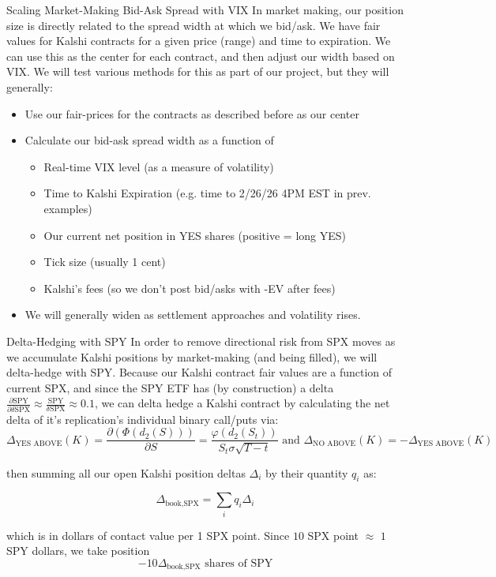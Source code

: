 \documentclass[aspectratio=169]{beamer}
\begin{document}
\begin{frame}{Scaling Market-Making Bid-Ask Spread with VIX}
  In market making, our position size is directly related to the spread width at which we bid/ask. We have fair values for Kalshi contracts for a given price (range) and time to expiration. We can use this as the center for each contract, and then adjust our width based on VIX. We will test various methods for this as part of our project, but they will generally:
 
  \begin{itemize}
    \item Use our fair-prices for the contracts as described before as our center
    \item Calculate our bid-ask spread width as a function of
        \begin{itemize}
            \item Real-time VIX level (as a measure of volatility)
            \item Time to Kalshi Expiration (e.g. time to 2/26/26 4PM EST in prev. examples)
            \item Our current net position in YES shares (positive = long YES)
            \item Tick size (usually 1 cent)
            \item Kalshi's fees (so we don't post bid/asks with -EV after fees)
        \end{itemize}
    \item We will generally widen as settlement approaches and volatility rises.
  \end{itemize}

\end{frame}

\begin{frame}{Delta-Hedging with SPY}
  In order to remove directional risk from SPX moves as we accumulate Kalshi positions by market-making (and being filled), we will delta-hedge with SPY. Because our Kalshi contract fair values are a function of current SPX, and since the SPY ETF has (by construction) a delta $\frac{\partial\text{SPY}}{\partial\delta{\text{SPX}}} \approx \frac{\text{SPY}}{\delta{\text{SPX}}} \approx 0.1$, we can delta hedge a Kalshi contract by calculating the net delta of it's replication's individual binary call/puts via:
  \[
    \Delta_{\text{YES ABOVE}}(K) = \frac{\partial(\Phi(d_2(S)))}{\partial S} = \frac{\varphi(d_2(S_t))}{S_t\sigma\sqrt{T-t}} \text{ and } \Delta_{\text{NO ABOVE}}(K) = -\Delta_{\text{YES ABOVE}}(K)
  \]

then summing all our open Kalshi position deltas $\Delta_i$ by their quantity $q_i$ as:

  \[
    \Delta_{\text{book,SPX}} = \sum_i q_i\Delta_i
  \]

which is in dollars of contact value per 1 SPX point. Since $10$ SPX point $\approx$ $1$ SPY dollars, we take position
\[
    -10\Delta_{\text{book,SPX}} \text{ shares of SPY}
\]

\end{frame}
\end{document}
